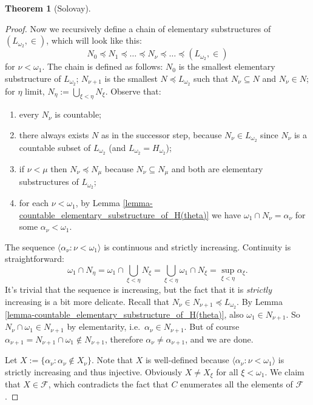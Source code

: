 \documentclass[12pt,a4paper]{report}
\theoremstyle{definition}
\newtheorem{theorem}{Theorem}[chapter] %
\theoremstyle{num.custom-title}
\DeclareMathOperator{\sse}{\subseteq}
\newcommand{\F}{\mathcal{F}}
\begin{document}
\begin{theorem}[Solovay]
\begin{proof}
Now we recursively define a chain of elementary substructures of $(L_{\omega_2},\in)$, which will look like this:
\[
N_0 \preceq N_1 \preceq \dots \preceq N_\nu \preceq \dots \preceq (L_{\omega_2},\in)
\]
for $\nu < \omega_1$. The chain is defined as follows: $N_0$ is the smallest elementary substructure of $L_{\omega_2}$; $N_{\nu+1}$ is the smallest $N \preceq L_{\omega_2}$ such that $N_\nu \sse N$ and $N_\nu \in N$; for $\eta$ limit, $N_\eta := \bigcup_{\xi < \eta} N_\xi$. Observe that:
\begin{enumerate}[--]
\item every $N_\nu$ is countable;
\item there always exists $N$ as in the successor step, because $N_\nu \in L_{\omega_2}$ since $N_\nu$ is a countable subset of $L_{\omega_2}$ (and $L_{\omega_2} = H_{\omega_2}$);
\item if $\nu < \mu$ then $N_\nu \preceq N_\mu$ because $N_\nu \sse N_\mu$ and both are elementary substructures of $L_{\omega_2}$;
\item for each $\nu < \omega_1$, by Lemma \ref{lemma-countable_elementary_substructure_of_H(theta)} we have $\omega_1 \cap N_\nu = \alpha_\nu$ for some $\alpha_\nu < \omega_1$.
\end{enumerate}
The sequence $\langle \alpha_\nu : \nu < \omega_1 \rangle$ is continuous and strictly increasing. Continuity is straightforward:
\[
\omega_1 \cap N_\eta = \omega_1 \cap \bigcup_{\xi < \eta} N_\xi = \bigcup_{\xi < \eta} \omega_1 \cap N_\xi = \sup_{\xi < \eta} \alpha_\xi.
\]
It's trivial that the sequence is increasing, but the fact that it is \emph{strictly} increasing is a bit more delicate. Recall that $N_\nu \in N_{\nu+1} \preceq L_{\omega_2}$. By Lemma \ref{lemma-countable_elementary_substructure_of_H(theta)}, also $\omega_1 \in N_{\nu+1}$. So $N_\nu \cap \omega_1 \in N_{\nu+1}$ by elementarity, i.e.\ $\alpha_\nu \in N_{\nu+1}$. But of course $\alpha_{\nu+1} = N_{\nu+1} \cap \omega_1 \not\in N_{\nu+1}$, therefore $\alpha_\nu \neq \alpha_{\nu+1}$, and we are done.

Let $X := \{ \alpha_\nu : \alpha_\nu \not\in X_\nu \}$. Note that $X$ is well-defined because $\langle \alpha_\nu : \nu < \omega_1 \rangle$ is strictly increasing and thus injective. Obviously $X \neq X_\xi$ for all $\xi < \omega_1$. We claim that $X \in \F$, which contradicts the fact that $C$ enumerates all the elements of $\F$.


\end{proof}
\end{theorem}
\end{document}
